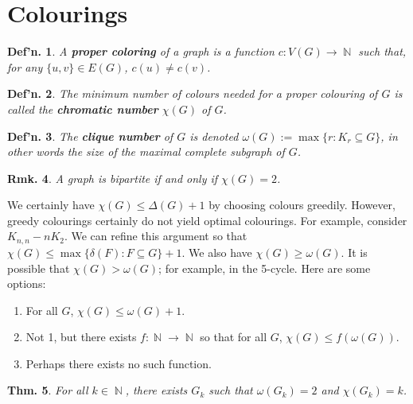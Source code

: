 \documentclass[12pt, a4paper]{book}
\DeclareMathOperator{\N}{\mathbb{N}}
\newtheorem{theorem}{Thm.}[section]
\newtheorem{definition}[theorem]{Def'n.}
\newtheorem{remark}[theorem]{Rmk.}
\theoremstyle{nonumberplain}
\begin{document}
\section{Colourings}
\begin{definition}
    A \textbf{proper coloring} of a graph is a function $c:V(G)\to\N$ such that, for any $\{u,v\}\in E(G)$, $c(u)\neq c(v)$.
\end{definition}
\begin{definition}
    The minimum number of colours needed for a proper colouring of $G$ is called the \textbf{chromatic number} $\chi(G)$ of $G$.
\end{definition}
\begin{definition}
    The \textbf{clique number} of $G$ is denoted $\omega(G):=\max\{r:K_r\subseteq G\}$, in other words the size of the maximal complete subgraph of $G$.
\end{definition}
\begin{remark}
    A graph is bipartite if and only if $\chi(G)=2$.
\end{remark}
We certainly have $\chi(G)\leq\Delta(G)+1$ by choosing colours greedily.
However, greedy colourings certainly do not yield optimal colourings.
For example, consider $K_{n,n}-nK_2$.
We can refine this argument so that $\chi(G)\leq\max\{\delta(F):F\subseteq G\}+1$.
We also have $\chi(G)\geq\omega(G)$.
It is possible that $\chi(G)>\omega(G)$; for example, in the 5-cycle.
Here are some options:
\begin{enumerate}
    \item For all $G$, $\chi(G)\leq\omega(G)+1$.
    \item Not 1, but there exists $f:\N\to\N$ so that for all $G$, $\chi(G)\leq f(\omega(G))$.
    \item Perhaps there exists no such function.
\end{enumerate}
\begin{theorem}
    For all $k\in\N$, there exists $G_k$ such that $\omega(G_k)=2$ and $\chi(G_k)=k$.
\end{theorem}
\end{document}
